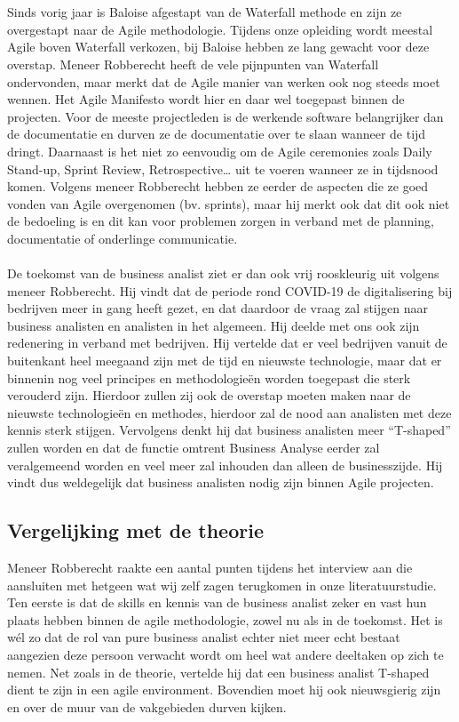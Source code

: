 \documentclass{hogent-article}
\begin{document}
\\~~\\
Sinds vorig jaar is Baloise afgestapt van de Waterfall methode en zijn ze overgestapt naar de Agile methodologie. Tijdens onze opleiding wordt meestal Agile boven Waterfall verkozen, bij Baloise hebben ze lang gewacht voor deze overstap. Meneer Robberecht heeft de vele pijnpunten van Waterfall ondervonden, maar merkt dat de Agile manier van werken ook nog steeds moet wennen. Het Agile Manifesto wordt hier en daar wel toegepast binnen de projecten. Voor de meeste projectleden is de werkende software belangrijker dan de documentatie en durven ze de documentatie over te slaan wanneer de tijd dringt. Daarnaast is het niet zo eenvoudig om de Agile ceremonies zoals Daily Stand-up, Sprint Review, Retrospective… uit te voeren wanneer ze in tijdsnood komen. Volgens meneer Robberecht hebben ze eerder de aspecten die ze goed vonden van Agile overgenomen (bv. sprints), maar hij merkt ook dat dit ook niet de bedoeling is en dit kan voor problemen zorgen in verband met de planning, documentatie of onderlinge communicatie.
\\~~\\
De toekomst van de business analist ziet er dan ook vrij rooskleurig uit volgens meneer Robberecht. Hij vindt dat de periode rond COVID-19 de digitalisering bij bedrijven meer in gang heeft gezet, en dat daardoor de vraag zal stijgen naar business analisten en analisten in het algemeen. Hij deelde met ons ook zijn redenering in verband met bedrijven. Hij vertelde dat er veel bedrijven vanuit de buitenkant heel meegaand zijn met de tijd en nieuwste technologie, maar dat er binnenin nog veel principes en methodologieën worden toegepast die sterk verouderd zijn. Hierdoor zullen zij ook de overstap moeten maken naar de nieuwste technologieën en methodes, hierdoor zal de nood aan analisten met deze kennis sterk stijgen. Vervolgens denkt hij dat business analisten meer “T-shaped” zullen worden en dat de functie omtrent Business Analyse eerder zal veralgemeend worden en veel meer zal inhouden dan alleen de businesszijde. Hij vindt dus weldegelijk dat business analisten nodig zijn binnen Agile projecten.


\subsection{Vergelijking met de theorie }

Meneer Robberecht raakte een aantal punten tijdens het interview aan die aansluiten met hetgeen wat wij zelf zagen terugkomen in onze literatuurstudie. Ten eerste is dat de skills en kennis van de business analist zeker en vast hun plaats hebben binnen de agile methodologie, zowel nu als in de toekomst. Het is wél zo dat de rol van pure business analist echter niet meer echt bestaat aangezien deze persoon verwacht wordt om heel wat andere deeltaken op zich te nemen. Net zoals in de theorie, vertelde hij dat een business analist T-shaped dient te zijn in een agile environment. Bovendien moet hij ook nieuwsgierig zijn en over de muur van de vakgebieden durven kijken.
\end{document}
